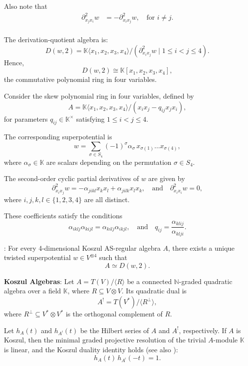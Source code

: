\documentclass{amsart}
\begin{document}
\begin{example}
Also note that 
\[
\begin{aligned}
\partial^2_{x_j x_i} w &= - \partial^2_{x_i x_j} w, \quad \text{for } i \neq j. \\    
\end{aligned}
\]

The derivation-quotient algebra is:
\[
D(w, 2) = \mathbb{K}\langle x_1, x_2, x_3, x_4 \rangle \big/ \left( \partial^2_{x_i x_j} w \mid 1 \leq i < j \leq 4 \right).
\]
Hence,
\[
D(w, 2) \cong \mathbb{K}[x_1, x_2, x_3, x_4],
\]
the commutative polynomial ring in four variables.
\end{example}

\begin{example}\label{superskewpolyring}
Consider the skew polynomial ring in four variables, defined by
\[
A = \mathbb{K} \langle x_1, x_2, x_3, x_4 \rangle \big/ (x_i x_j - q_{ij} x_j x_i),
\]
for parameters \( q_{ij} \in \mathbb{K}^\times \) satisfying \(1 \leq i < j \leq 4\).

The corresponding superpotential is
\[
w = \sum_{\sigma \in S_4} (-1)^\sigma \alpha_\sigma \, x_{\sigma(1)} \ldots x_{\sigma(4)},
\]
where \( \alpha_\sigma \in \mathbb{K} \) are scalars depending on the permutation \( \sigma \in S_4 \).

The second-order cyclic partial derivatives of \( w \) are given by
\[
\partial^2_{x_i x_j}w = -\alpha_{jikl} x_k x_l + \alpha_{jilk} x_l x_k,
\quad \text{and} \quad
\partial^2_{x_i x_i}w = 0,
\]
where \( i, j, k, l \in \{1,2,3,4\} \) are all distinct.

These coefficients satisfy the conditions
\[
\alpha_{iklj} \alpha_{kijl} = \alpha_{kilj} \alpha_{ikjl},
\quad \text{and} \quad
q_{ij} = \frac{\alpha_{klij}}{\alpha_{klji}}.
\]
\end{example}

\begin{theorem}\cite[Theorem 11]{duboisviolette2014multilinearformsgradedalgebras}\label{Aisomorphic-Dw2}:
For every 4-dimensional Koszul AS-regular algebra $A$, there exists a unique twisted superpotential $ w \in V^{\otimes 4}$ such that
    \[
    A \simeq D(w, 2).
    \]
\end{theorem}

\begin{definition}
\textbf{Koszul Algebras}:
Let \( A = T(V)/\langle R \rangle \) be a connected \(\mathbb{N}\)-graded quadratic algebra over a field \( \mathbb{K} \), where \( R \subseteq V \otimes V \). Its quadratic dual is
\[
A^! = T(V^*) / \langle R^\perp \rangle,
\]
where \( R^\perp \subseteq V^* \otimes V^* \) is the orthogonal complement of \( R \).

Let \( h_A(t) \) and \( h_{A^!}(t) \) be the Hilbert series of \( A \) and \( A^! \), respectively.
If \( A \) is Koszul, then the minimal graded projective resolution of the trivial \( A \)-module \( \mathbb{K} \) is linear, and the Koszul duality identity holds \cite{Positselskii1995} (see also \cite[Thm.~5.9]{MR1388568}):
\[
h_A(t)\, h_{A^!}(-t) = 1.
\]
    
\end{definition}
\end{document}
